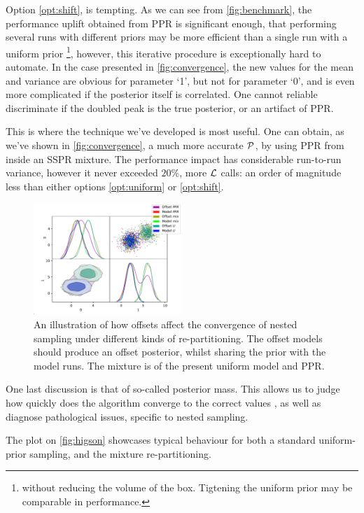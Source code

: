 \documentclass[usenatbib]{mnras}
\begin{document}
Option \ref{opt:shift}, is tempting. As we can see from
\autoref{fig:benchmark}, the performance uplift obtained from PPR is
significant enough, that performing several runs with different
priors may be more efficient than a single run with a uniform prior
\footnote{without reducing the volume of the box. Tigtening the uniform
prior may be comparable in performance.}, however, this iterative
procedure is exceptionally hard to automate. In the case presented
in \autoref{fig:convergence}, the new values for the mean and variance
are obvious for parameter `1', but not for parameter `0', and is
even more complicated if the posterior itself is correlated. One
cannot reliable discriminate if the doubled peak is the true
posterior, or an artifact of PPR.

This is where the technique we've developed is most useful. One can
obtain, as we've shown in \autoref{fig:convergence}, a much more
accurate \({\cal P}\), by using PPR from inside an SSPR mixture. The
performance impact has considerable run-to-run variance, however it
never exceeded \(20\%\), more \({\cal L}\) calls: an order of magnitude
less than either options \ref{opt:uniform} or \ref{opt:shift}. 

\begin{figure}
\includegraphics[width=0.5\textwidth]{./illustrations/convergence.pdf}
\caption{\label{orga337e0a}
An illustration of how offsets affect the convergence of nested sampling under different kinds of re-partitioning. The offset models should produce an offset posterior, whilst sharing the prior with the model runs. The mixture is of the present uniform model and PPR.}
\end{figure}



One last discussion is that of so-called posterior mass. This allows
us to judge how quickly does the algorithm converge to the correct
values \cite{higson2018nestcheck}, as well as diagnose pathological
issues, specific to nested sampling. 

The plot on \autoref{fig:higson} showcases typical behaviour for
both a standard uniform-prior sampling, and the mixture
re-partitioning. 
\end{document}
